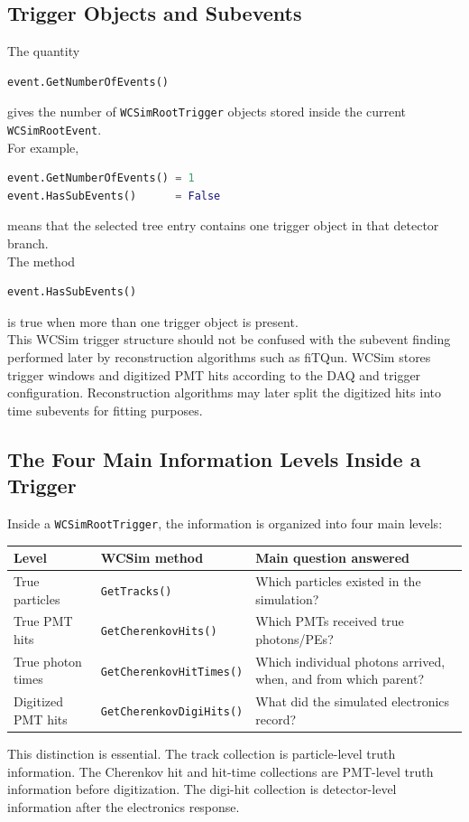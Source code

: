 \documentclass{article}
\numberwithin{table}{subsection}
\numberwithin{figure}{subsection}
\numberwithin{equation}{subsection}
\numberwithin{footnote}{subsection}
\begin{document}
\subsection{Trigger Objects and Subevents}

The quantity
\begin{lstlisting}
event.GetNumberOfEvents()
\end{lstlisting}
gives the number of \texttt{WCSimRootTrigger} objects stored inside the current
\texttt{WCSimRootEvent}.\\
For example,
\begin{lstlisting}[language=python]
event.GetNumberOfEvents() = 1
event.HasSubEvents()      = False
\end{lstlisting}
means that the selected tree entry contains one trigger object in that detector
branch.\\
The method
\begin{lstlisting}
event.HasSubEvents()
\end{lstlisting}
is true when more than one trigger object is present.\\
This WCSim trigger structure should not be confused with the subevent finding
performed later by reconstruction algorithms such as fiTQun. WCSim stores
trigger windows and digitized PMT hits according to the DAQ and trigger
configuration. Reconstruction algorithms may later split the digitized hits into
time subevents for fitting purposes.

\subsection{The Four Main Information Levels Inside a Trigger}

Inside a \texttt{WCSimRootTrigger}, the information is organized into four main
levels:

\begin{center}
\begin{tabular}{lll}
\hline
Level & WCSim method & Main question answered \\
\hline
True particles &
\texttt{GetTracks()} &
Which particles existed in the simulation? \\

True PMT hits &
\texttt{GetCherenkovHits()} &
Which PMTs received true photons/PEs? \\

True photon times &
\texttt{GetCherenkovHitTimes()} &
Which individual photons arrived, when, and from which parent? \\

Digitized PMT hits &
\texttt{GetCherenkovDigiHits()} &
What did the simulated electronics record? \\
\hline
\end{tabular}
\end{center}
This distinction is essential. The track collection is particle-level truth
information. The Cherenkov hit and hit-time collections are PMT-level truth
information before digitization. The digi-hit collection is detector-level
information after the electronics response.
\end{document}
